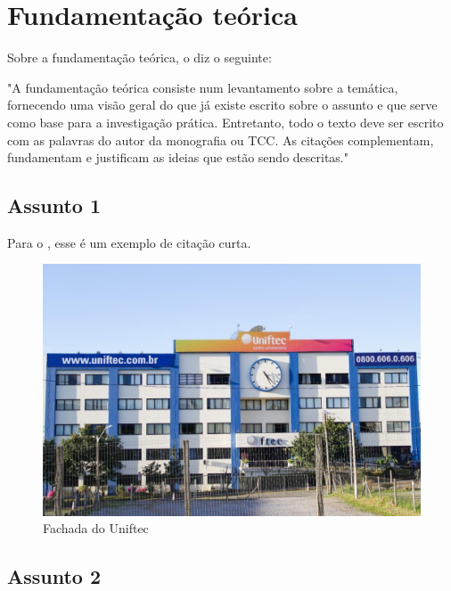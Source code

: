 \chapter{Fundamentação teórica}

Sobre a fundamentação teórica, o  diz o seguinte:

\begin{citacao}
"A fundamentação teórica consiste num levantamento sobre a temática, fornecendo uma visão geral do que já existe escrito sobre o assunto e que serve como base para a investigação prática. Entretanto, todo o texto deve ser escrito com as palavras do autor da monografia ou TCC. As citações complementam, fundamentam e justificam as ideias que estão sendo descritas."
\end{citacao}

\section{Assunto 1}

Para o , esse é um exemplo de citação curta.

\lipsum[1-2]

\begin{figure}[!ht]
    \centering
    \caption{Fachada do Uniftec}
    \label{graf1}
    \includegraphics[width=1\textwidth]{img/fachada.jpg}
    \captionsetup{justification=normal}
\end{figure}

\section{Assunto 2}


